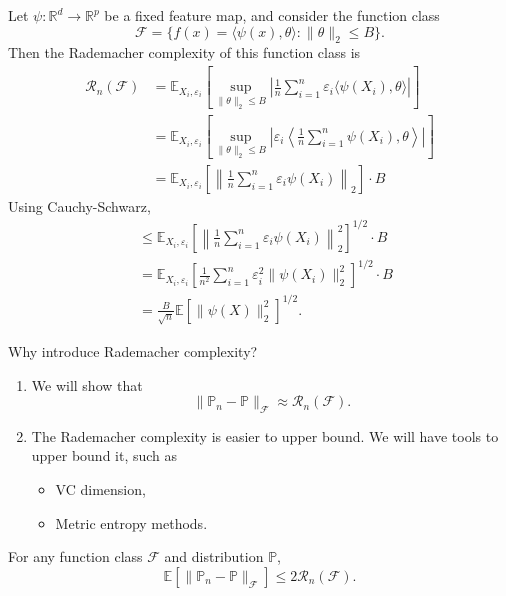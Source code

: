 \begin{exam}
Let $\psi : \mathbb{R}^d \to \mathbb{R}^p$ be a fixed feature map, and consider the function class
\[
\mathcal{F} = \{f(x) = \langle \psi(x), \theta \rangle : \|\theta\|_2 \leq B\}.
\]
Then the Rademacher complexity of this function class is
\begin{align*}
\mathcal{R}_n(\mathcal{F}) &= \mathbb{E}_{X_i, \varepsilon_i} \left[ \sup_{\|\theta\|_2 \leq B} \left| \frac{1}{n} \sum_{i=1}^n \varepsilon_i \langle \psi(X_i), \theta \rangle \right| \right] \\
&= \mathbb{E}_{X_i, \varepsilon_i} \left[ \sup_{\|\theta\|_2 \leq B} \left| \varepsilon_i \left\langle \frac{1}{n} \sum_{i=1}^n \psi(X_i), \theta \right\rangle \right| \right] \\
&= \mathbb{E}_{X_i, \varepsilon_i} \left[ \left\| \frac{1}{n} \sum_{i=1}^n \varepsilon_i \psi(X_i) \right\|_2 \right] \cdot B
\end{align*}
Using Cauchy-Schwarz,
\begin{align*}
&\leq \mathbb{E}_{X_i, \varepsilon_i} \left[ \left\| \frac{1}{n} \sum_{i=1}^n \varepsilon_i \psi(X_i) \right\|_2^2 \right]^{1/2} \cdot B \\
&= \mathbb{E}_{X_i, \varepsilon_i} \left[ \frac{1}{n^2} \sum_{i=1}^n \varepsilon_i^2 \|\psi(X_i)\|_2^2 \right]^{1/2} \cdot B \\
&= \frac{B}{\sqrt{n}} \mathbb{E}[\|\psi(X)\|_2^2]^{1/2}.
\end{align*}
\end{exam}

\begin{rem}Why introduce Rademacher complexity?
\begin{enumerate}
    \item We will show that
    \[
    \|\mathbb{P}_n - \mathbb{P}\|_{\mathcal{F}} \approx \mathcal{R}_n(\mathcal{F}).
    \]
    \item The Rademacher complexity is easier to upper bound. We will have tools to upper bound it, such as
    \begin{itemize}
        \item VC dimension,
        \item Metric entropy methods.
    \end{itemize}
\end{enumerate}
\end{rem}


\begin{prop}
For any function class $\mathcal{F}$ and distribution $\mathbb{P}$,
\[
\mathbb{E}[\|\mathbb{P}_n - \mathbb{P}\|_{\mathcal{F}}] \leq 2\mathcal{R}_n(\mathcal{F}).
\]
\end{prop}

